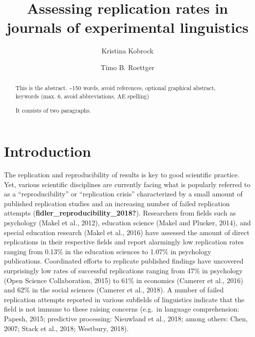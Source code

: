 \documentclass[]{elsarticle} %
\begin{document}
\begin{frontmatter}

  \title{Assessing replication rates in journals of experimental
linguistics}
    \author[University of Osnabrück]{Kristina Kobrock}
    \author[University of Oslo]{Timo B. Roettger}
  
      \address[University of Osnabrück]{Department, Street, City, State,
Zip}
    \address[University of Oslo]{Department, Street, City, State, Zip}
  
  \begin{abstract}
  This is the abstract. \textasciitilde150 words, avoid references,
  optional graphical abstract, keywords (max. 6, avoid abbreviations, AE
  spelling)

  It consists of two paragraphs.
  \end{abstract}
  
 \end{frontmatter}

\hypertarget{introduction}{%
\section{Introduction}\label{introduction}}

The replication and reproducibility of results is key to good scientific
practice. Yet, various scientific disciplines are currently facing what
is popularly referred to as a ``reproducibility'' or ``replication
crisis'' characterized by a small amount of published replication
studies and an increasing number of failed replication attempts
(\textbf{fidler\_reproducibility\_2018?}). Researchers from fields such
as psychology (Makel et al., 2012), education science (Makel and
Plucker, 2014), and special education research (Makel et al., 2016) have
assessed the amount of direct replications in their respective fields
and report alarmingly low replication rates ranging from 0.13\% in the
education sciences to 1.07\% in psychology publications. Coordinated
efforts to replicate published findings have uncovered surprisingly low
rates of successful replications ranging from 47\% in psychology (Open
Science Collaboration, 2015) to 61\% in economics (Camerer et al., 2016)
and 62\% in the social sciences (Camerer et al., 2018). A number of
failed replication attempts reported in various subfields of linguistics
indicate that the field is not immune to these raising concerns (e.g.~in
language comprehension: Papesh, 2015; predictive processing: Nieuwland
et al., 2018; among others: Chen, 2007; Stack et al., 2018; Westbury,
2018).
\end{document}
